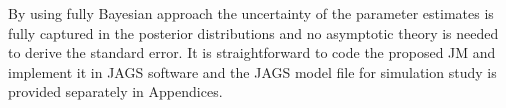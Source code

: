 By using fully Bayesian approach the uncertainty of the parameter estimates is fully captured in the posterior distributions and no asymptotic theory is needed to derive the standard error. 
It is straightforward to code the proposed JM and implement it in \textsf{JAGS} software \citep{plummer2003jags} and the \textsf{JAGS} model file for simulation study is provided separately in Appendices.








%
%
% 


% 